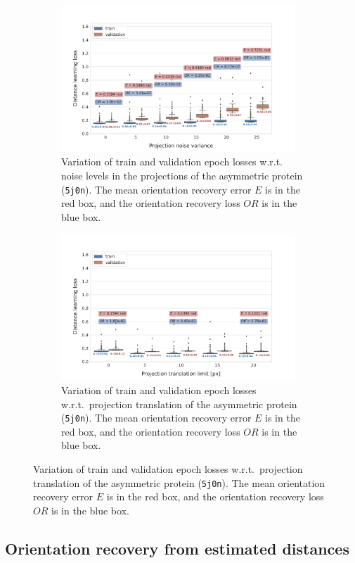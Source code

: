 \begin{figure}[ht!]
    \centering
    \begin{subfigure}[b]{0.47\textwidth}
        \includegraphics[height=5.5cm,valign=t]{figures/de_noises_nums}
        \caption{%
            Variation of train and validation epoch losses w.r.t. noise levels in the projections of the asymmetric protein (\texttt{5j0n}). The mean orientation recovery error $E$ is in the red box, and the orientation recovery loss $OR$ is in the blue box.
        }\label{fig:distance-estimation-vary-projection-noise}
    \end{subfigure}
    \hfill
    \begin{subfigure}[b]{0.47\textwidth}
        \includegraphics[height=5.5cm,valign=t]{figures/de_translation_nums}
        \caption{
        Variation of train and validation epoch losses w.r.t.\ projection translation of the asymmetric protein (\texttt{5j0n}). The mean orientation recovery error $E$ is in the red box, and the orientation recovery loss $OR$ is in the blue box.
    }\label{fig:distance-estimation-vary-projection-translation}
    \end{subfigure}
\end{figure}

\subsection{Orientation recovery from estimated distances}

